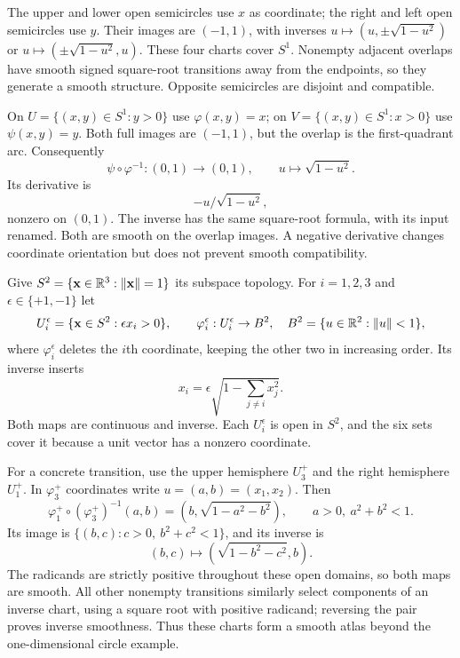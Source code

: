 \begin{example}
The upper and lower open semicircles use $x$ as coordinate; the right and
left open semicircles use $y$. Their images are $(-1,1)$, with inverses
$u\mapsto(u,\pm\sqrt{1-u^2})$ or $u\mapsto(\pm\sqrt{1-u^2},u)$.
These four charts cover $S^1$. Nonempty adjacent overlaps have smooth
signed square-root transitions away from the endpoints, so they generate
a smooth structure. Opposite semicircles are disjoint and compatible.
\end{example}
\begin{example}
On $U=\{(x,y)\in S^1:y>0\}$ use $\varphi(x,y)=x$; on
$V=\{(x,y)\in S^1:x>0\}$ use $\psi(x,y)=y$. Both full images are
$(-1,1)$, but the overlap is the first-quadrant arc. Consequently
\[
\psi\circ\varphi^{-1}:(0,1)\to(0,1),\qquad
u\mapsto\sqrt{1-u^2}.
\]
Its derivative is
\[
-u/\sqrt{1-u^2},
\]
 nonzero on $(0,1)$.
The inverse has the same square-root formula, with its input renamed.
Both are smooth on the overlap images. A negative derivative changes
coordinate orientation but does not prevent smooth compatibility.
\end{example}


\begin{example}\label{ex:sphere-atlas}
Give $S^2=\{\mathbf{x}\in\mathbb{R}^3:\lVert \mathbf{x}\rVert=1\}$ its subspace topology. For
$i=1,2,3$ and $\epsilon\in\{+1,-1\}$ let
\[
U_i^\epsilon=\{\mathbf{x}\in S^2:\epsilon x_i>0\},\qquad
\varphi_i^\epsilon:U_i^\epsilon\to B^2,
\quad B^2=\{u\in\mathbb{R}^2:\lVert u\rVert<1\},
\]
where $\varphi_i^\epsilon$ deletes the $i$th coordinate, keeping the other
two in increasing order. Its inverse inserts
\[
x_i=\epsilon\sqrt{1-\sum_{j\ne i}x_j^2}.
\]
Both maps are continuous and inverse. Each $U_i^\epsilon$ is open in
$S^2$, and the six sets cover it because a unit vector has a nonzero
coordinate.


\FloatBarrier
For a concrete transition, use the upper hemisphere $U_3^+$
and the right hemisphere $U_1^+$. In $\varphi_3^+$ coordinates write
$u=(a,b)=(x_1,x_2)$. Then
\[
\varphi_1^+\circ(\varphi_3^+)^{-1}(a,b)
=(b,\sqrt{1-a^2-b^2}),\qquad a>0,\ a^2+b^2<1.
\]
Its image is $\{(b,c):c>0,\ b^2+c^2<1\}$, and its inverse is
\[
(b,c)\longmapsto(\sqrt{1-b^2-c^2},b).
\]
The radicands are strictly positive throughout these open domains, so
both maps are smooth. All other nonempty transitions similarly select
components of an inverse chart, using a square root with positive
radicand; reversing the pair proves inverse smoothness. Thus these charts
form a smooth atlas beyond the one-dimensional circle example.
\end{example}


